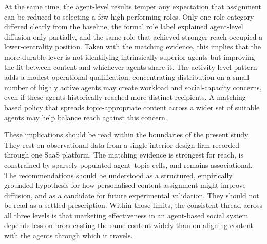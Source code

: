 At the same time, the agent-level results temper any expectation that assignment can be reduced to selecting a few high-performing roles. Only one role category differed clearly from the baseline, the formal role label explained agent-level diffusion only partially, and the same role that achieved stronger reach occupied a lower-centrality position. Taken with the matching evidence, this implies that the more durable lever is not identifying intrinsically superior agents but improving the fit between content and whichever agents share it. The activity-level pattern adds a modest operational qualification: concentrating distribution on a small number of highly active agents may create workload and social-capacity concerns, even if these agents historically reached more distinct recipients. A matching-based policy that spreads topic-appropriate content across a wider set of suitable agents may help balance reach against this concern.

These implications should be read within the boundaries of the present study. They rest on observational data from a single interior-design firm recorded through one SaaS platform. The matching evidence is strongest for reach, is constrained by sparsely populated agent–topic cells, and remains associational. The recommendations should be understood as a structured, empirically grounded hypothesis for how personalised content assignment might improve diffusion, and as a candidate for future experimental validation. They should not be read as a settled prescription. Within those limits, the consistent thread across all three levels is that marketing effectiveness in an agent-based social system depends less on broadcasting the same content widely than on aligning content with the agents through which it travels.
